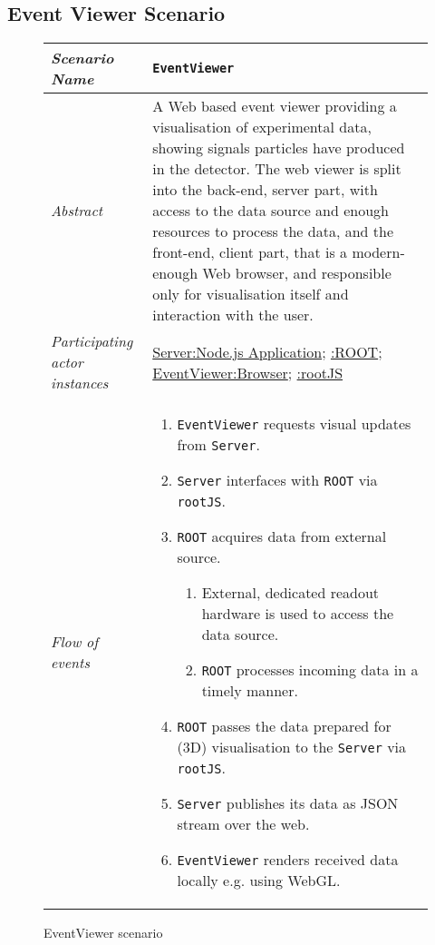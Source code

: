 \subsection{Event Viewer Scenario}
\begin{figure}[htb]
	\centering
	\begin{longtable}{p{3cm} @{\hskip 1cm} p{12cm}}
		\hline
		\textit{Scenario Name} & \texttt{EventViewer}\\
		\hline
		\textit{Abstract} &
		A Web based event viewer providing a visualisation of experimental data, showing signals particles have produced in the detector.
		The web viewer is split into the back-end, server part, with access to
	    the data source and enough resources to process the data, and the front-end, client part, that is a modern-enough Web browser, and responsible only for visualisation itself and interaction with the user.
		\\
		\hline
		\textit{Participating actor instances} & 
		\underline{Server:Node.js Application}; \underline{:ROOT}; \underline{EventViewer:Browser}; \underline{:rootJS}\\
		\hline
		\textit{Flow of events} &
		\begin{enumerate}
			\item \texttt{EventViewer} requests visual updates from \texttt{Server}.
			\item \texttt{Server} interfaces with \texttt{ROOT} via \texttt{rootJS}.
			\item \texttt{ROOT} acquires data from external source.
			\begin{enumerate}
					\item External, dedicated readout hardware is used to access the data source.
					\item \texttt{ROOT} processes incoming data in a timely manner.
			\end{enumerate}
			\item \texttt{ROOT} passes the data prepared for (3D) visualisation to the \texttt{Server} via \texttt{rootJS}.
			\item \texttt{Server} publishes its data as JSON stream over the web.
			\item \texttt{EventViewer} renders received data locally e.g. using WebGL.
		\end{enumerate}
		\\
		\hline
	\end{longtable}
	\caption{EventViewer scenario}
\end{figure}